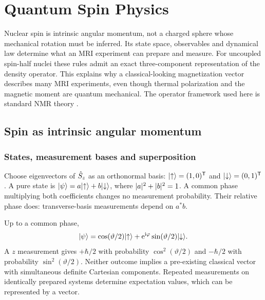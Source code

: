 \chapter{Quantum Spin Physics}
\label{ch:02}

Nuclear spin is intrinsic angular momentum, not a charged sphere whose
mechanical rotation must be inferred. Its state space, observables and
dynamical law determine what an MRI experiment can prepare and measure.
For uncoupled spin-half nuclei these rules admit an exact three-component
representation of the density operator. This explains why a classical-looking
magnetization vector describes many MRI experiments, even though thermal
polarization and the magnetic moment are quantum mechanical. The operator
framework used here is standard NMR theory \cite{levitt2008}.

\section{Spin as intrinsic angular momentum}
\label{sec:02:spin-as-intrinsic-angular-momentum}
\subsection{States, measurement bases and superposition}
Choose eigenvectors of $\hat{S}_z$ as an orthonormal basis:
$\lvert \uparrow\rangle=(1,0)^{\mathsf T}$ and
$\lvert \downarrow\rangle=(0,1)^{\mathsf T}$.
A pure state is $\lvert \psi\rangle=a\lvert \uparrow\rangle+b\lvert \downarrow\rangle$,
where $\lvert a\rvert^2+\lvert b\rvert^2=1$. A common phase multiplying both coefficients
changes no measurement probability. Their relative phase does:
transverse-basis measurements depend on $a^*b$.

Up to a common phase,
\[
 \lvert \psi\rangle=\cos(\vartheta/2)\lvert \uparrow\rangle
       +\mathrm{e}^{\mathrm{i}\varphi}\sin(\vartheta/2)\lvert \downarrow\rangle.
\]
A $z$ measurement gives $+\hbar/2$ with probability
$\cos^2(\vartheta/2)$ and $-\hbar/2$ with probability
$\sin^2(\vartheta/2)$. Neither outcome implies a pre-existing classical
vector with simultaneous definite Cartesian components. Repeated
measurements on identically prepared systems determine expectation
values, which can be represented by a vector.

